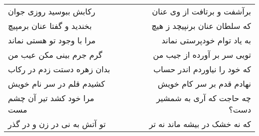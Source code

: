 \begin{center}
\begin{longtable}{l p{0.5cm} r}
رکابش ببوسید روزی جوان
&&
برآشفت و برتافت از وی عنان
\\
بخندید و گفتا عنان برمپیچ
&&
که سلطان عنان برنپیچد ز هیچ
\\
مرا با وجود تو هستی نماند
&&
به یاد توام خودپرستی نماند
\\
گرم جرم بینی مکن عیب من
&&
تویی سر بر آورده از جیب من
\\
بدان زهره دستت زدم در رکاب
&&
که خود را نیاوردم اندر حساب
\\
کشیدم قلم در سر نام خویش
&&
نهادم قدم بر سر کام خویش
\\
مرا خود کشد تیر آن چشم مست
&&
چه حاجت که آری به شمشیر دست؟
\\
تو آتش به نی در زن و در گذر
&&
که نه خشک در بیشه ماند نه تر
\\
\end{longtable}
\end{center}
